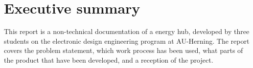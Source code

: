 \section*{Executive summary} 
This report is a non-technical documentation of a energy hub, developed by three students on the electronic design engineering program at AU-Herning. The report covers the problem statement, which work process has been used, what parts of the product that have been developed, and a reception of the project.